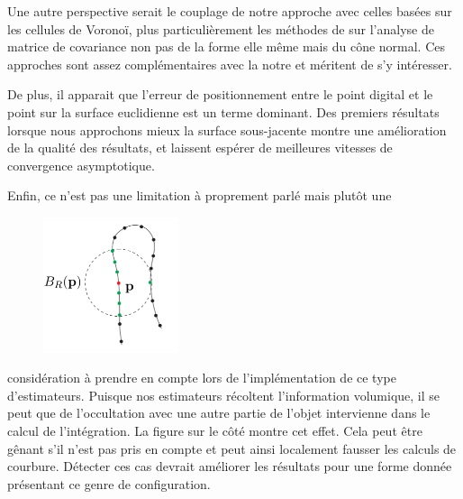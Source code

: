 Une autre perspective serait le couplage de notre approche avec celles basées
sur les cellules de Voronoï, plus particulièrement les méthodes de \VCMM
\cite{Merigot2009,Merigot2011,Cuel2014} sur l'analyse de matrice de covariance
non pas de la forme elle même mais du cône normal. Ces approches sont
assez complémentaires avec la notre et méritent de s'y intéresser.


De plus, il apparait que l'erreur de positionnement entre le point digital et le
point sur la surface euclidienne est un terme dominant. Des premiers résultats
lorsque nous approchons mieux la surface sous-jacente montre une amélioration de
la qualité des résultats, et laissent espérer de meilleures vitesses de
convergence asymptotique.

Enfin, ce n'est pas une limitation à proprement parlé mais plutôt une
%
\begin{figure}
	\includegraphics[width=4cm]{images/CriticalRadius}
\end{figure}
%
considération à prendre en compte lors de l'implémentation de ce type
d'estimateurs. Puisque nos estimateurs récoltent l'information volumique, il se
peut que de l'occultation avec une autre partie de l'objet intervienne dans le
calcul de l’intégration. La figure sur le côté montre cet effet. Cela peut être
gênant s'il n'est pas pris en compte et peut ainsi localement fausser les
calculs de courbure. Détecter ces cas devrait améliorer les résultats pour une
forme donnée présentant ce genre de configuration.
%
